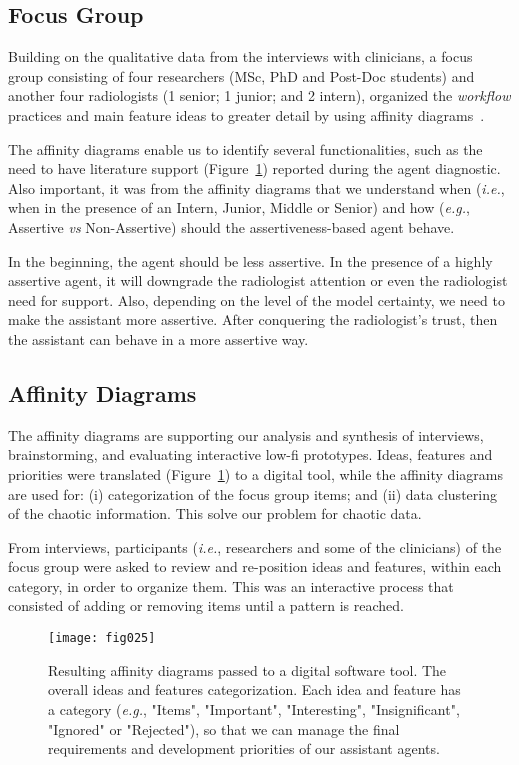 \subsection{Focus Group}
\label{sec:sec00502}

Building on the qualitative data from the interviews with clinicians, a focus group consisting of four researchers (MSc, PhD and Post-Doc students) and another four radiologists (1 senior; 1 junior; and 2 intern), organized the {\it workflow} practices and main feature ideas to greater detail by using affinity diagrams~\cite{Hoiseth:2013:RGD:2468356.2468436}.

The affinity diagrams enable us to identify several functionalities, such as the need to have literature support (Figure~\ref{fig:fig025}) reported during the agent diagnostic.
Also important, it was from the affinity diagrams that we understand when ({\it i.e.}, when in the presence of an Intern, Junior, Middle or Senior) and how ({\it e.g.}, Assertive {\it vs} Non-Assertive) should the assertiveness-based agent behave.

In the beginning, the agent should be less assertive.
In the presence of a highly assertive agent, it will downgrade the radiologist attention or even the radiologist need for support.
Also, depending on the level of the model certainty, we need to make the assistant more assertive.
After conquering the radiologist’s trust, then the assistant can behave in a more assertive way.

\subsection{Affinity Diagrams}
\label{sec:sec00503}

The affinity diagrams are supporting our analysis and synthesis of interviews, brainstorming, and evaluating interactive low-fi prototypes.
Ideas, features and priorities were translated (Figure~\ref{fig:fig025}) to a digital tool, while the affinity diagrams are used for: (i) categorization of the focus group items; and (ii) data clustering of the chaotic information.
This solve our problem for chaotic data.

From interviews, participants ({\it i.e.}, researchers and some of the clinicians) of the focus group were asked to review and re-position ideas and features, within each category, in order to organize them.
This was an interactive process that consisted of adding or removing items until a pattern is reached.

\begin{figure}[htbp]
\centering
\texttt{[image: fig025]}
\caption{Resulting affinity diagrams passed to a digital software tool. The overall ideas and features categorization. Each idea and feature has a category ({\it e.g.}, "Items", "Important", "Interesting", "Insignificant", "Ignored" or "Rejected"), so that we can manage the final requirements and development priorities of our assistant agents.}
\label{fig:fig025}
\end{figure}

